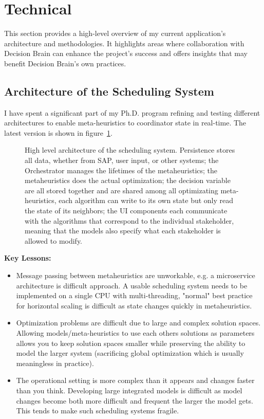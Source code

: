 \newpage
\section*{Technical}
\label{sec:technical}
This section provides a high-level overview of my current application's
architecture and methodologies. It highlights areas where collaboration with
Decision Brain can enhance the project's success and offers insights that may
benefit Decision Brain's own practices.

\subsection*{Architecture of the Scheduling System}
I have spent a significant part of my Ph.D. program refining and testing different architectures to enable
meta-heuristics to coordinator state in real-time. The latest version is shown in figure~\ref{fig:ordinator:architecture}.

\begin{figure}[H]
	\centering
	

	\caption{
		High level architecture of the scheduling system. Persistence stores
		all data, whether from SAP, user input, or other systems; the Orchestrator manages the lifetimes of the 
		metaheuristics; the metaheuristics does the actual optimization;
		the decision variable are all stored together and are shared among all optimizating meta-heuristics, 
		each algorithm can write to its own state but only read the state of its neighbors; the UI components
		each communicate with the algorithms that correspond to the individual stakeholder, meaning that the 
		models also specify what each stakeholder is allowed to modify.
	}
	\label{fig:ordinator:architecture}
\end{figure}

\textbf{Key Lessons:}
\begin{itemize}
	\item Message passing between metaheuristics are unworkable, e.g. a microservice architecture is difficult approach. A usable scheduling
	      system needs to be implemented on a single CPU with multi-threading, "normal" best practice for horizontal scaling is difficult as 
		  state changes quickly in metaheuristics. 
	\item Optimization problems are difficult due to large and complex solution spaces. Allowing models/meta-heuristics
		  to use each others solutions as parameters allows you to keep solution spaces smaller while preserving the 
		  ability to model the larger system (sacrificing global optimization which is usually meaningless in practice).
	\item The operational setting is more complex than it appears and changes faster than you think. Developing large integrated models 
		  is difficult as model changes become both more difficult and frequent the larger the model gets. This tends to make
		  such scheduling systems fragile.
\end{itemize}

